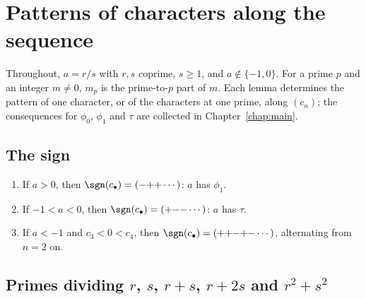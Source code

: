\chapter{Patterns of characters along the sequence}
\label{chap:patterns}

Throughout, $a = r/s$ with $r, s$ coprime, $s \ge 1$, and $a \notin \{-1, 0\}$. For a prime $p$
and an integer $m \ne 0$, $m_p$ is the prime-to-$p$ part of $m$. Each lemma determines the
pattern of one character, or of the characters at one prime, along $(c_n)$; the consequences
for $\phi_0$, $\phi_1$ and $\tau$ are collected in Chapter~\ref{chap:main}.

\section{The sign}

\begin{lemma}
  \label{lem:pat-sign}
  \leanok
  \begin{enumerate}
    \item If $a > 0$, then $\sgn(c_\bullet) = ({-}{+}{+}\cdots)$: $a$ has $\phi_1$.
    \item If $-1 < a < 0$, then $\sgn(c_\bullet) = ({+}{-}{-}\cdots)$: $a$ has $\tau$.
    \item If $a < -1$ and $c_3 < 0 < c_4$, then
          $\sgn(c_\bullet) = ({+}{+}{-}{+}{-}\cdots)$, alternating from $n = 2$ on.
  \end{enumerate}
\end{lemma}

\section{Primes dividing \texorpdfstring{$r$, $s$, $r + s$, $r + 2s$ and $r^2 + s^2$}{r, s, r + s, r + 2s and r^2 + s^2}}

